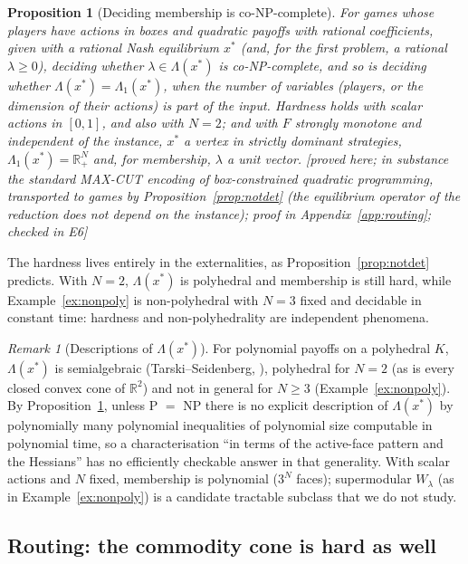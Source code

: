 \documentclass[11pt,a4paper]{article}
\theoremstyle{plain}
\newtheorem{proposition}[theorem]{Proposition}
\theoremstyle{definition}
\theoremstyle{remark}
\newtheorem{remark}[theorem]{Remark}
\newcommand{\R}{\mathbb{R}}
\newcommand{\status}[1]{\textsf{\small [#1]}}
\newcommand{\Lam}{\Lambda}
\newcommand{\Lone}{\Lambda_{1}}
\begin{document}
\begin{proposition}[Deciding membership is co-NP-complete]\label{prop:hard}
For games whose players have actions in boxes and quadratic payoffs with rational coefficients, given with a rational Nash equilibrium $x^*$ (and, for the first problem, a rational $\lambda\ge0$), deciding whether $\lambda\in\Lam(x^*)$ is co-NP-complete, and so is deciding whether $\Lam(x^*)=\Lone(x^*)$, when the number of variables (players, or the dimension of their actions) is part of the input. Hardness holds with scalar actions in $[0,1]$, and also with $N=2$; and with $F$ strongly monotone and independent of the instance, $x^*$ a vertex in strictly dominant strategies, $\Lone(x^*)=\R^N_+$ and, for membership, $\lambda$ a unit vector. \status{proved here; in substance the standard MAX-CUT encoding of box-constrained quadratic programming, transported to games by Proposition~\ref{prop:notdet} (the equilibrium operator of the reduction does not depend on the instance); proof in Appendix~\ref{app:routing}; checked in E6}
\end{proposition}
\noindent The hardness lives entirely in the externalities, as Proposition~\ref{prop:notdet} predicts. With $N=2$, $\Lam(x^*)$ is polyhedral and membership is still hard, while Example~\ref{ex:nonpoly} is non-polyhedral with $N=3$ fixed and decidable in constant time: hardness and non-polyhedrality are independent phenomena.

\begin{remark}[Descriptions of $\Lam(x^*)$]\label{rem:q1}
For polynomial payoffs on a polyhedral $K$, $\Lam(x^*)$ is semialgebraic (Tarski--Seidenberg, \citealp{bochnakCosteRoy1998}), polyhedral for $N=2$ (as is every closed convex cone of $\R^2$) and not in general for $N\ge3$ (Example~\ref{ex:nonpoly}). By Proposition~\ref{prop:hard}, unless P $=$ NP there is no explicit description of $\Lam(x^*)$ by polynomially many polynomial inequalities of polynomial size computable in polynomial time, so a characterisation ``in terms of the active-face pattern and the Hessians'' has no efficiently checkable answer in that generality. With scalar actions and $N$ fixed, membership is polynomial ($3^N$ faces); supermodular $W_\lambda$ (as in Example~\ref{ex:nonpoly}) is a candidate tractable subclass that we do not study.
\end{remark}

\subsection*{Routing: the commodity cone is hard as well}
\end{document}
